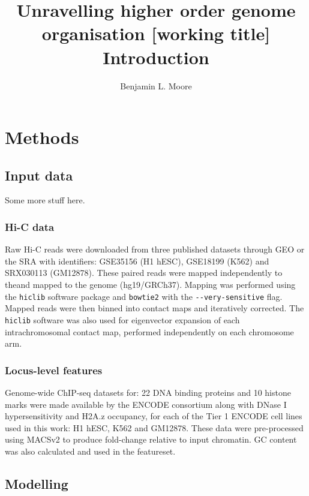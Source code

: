 \documentclass[a4paper,10pt,oneside]{book}
\title{ \vspace{3in} Unravelling higher order genome organisation {\small [working
    title]} \\ \vspace{2em} {\large {\bf Introduction}} }
\author{Benjamin L. Moore}
\begin{document}
\maketitle

\chapter{Methods}

\section{Input data}\label{input-data}

Some more stuff here.

\subsection{Hi-C data}\label{hi-c-data}

Raw Hi-C reads were downloaded from three published datasets through
GEO\citep{Barrett2013} or the SRA\citep{Leinonen2011a} with identifiers:
GSE35156 (H1 hESC), GSE18199 (K562) and SRX030113 (GM12878). These
paired reads were mapped independently to theand mapped to the genome
(hg19/GRCh37). Mapping was performed using the \texttt{hiclib} software
package\citep{Imakaev2012} and \texttt{bowtie2}\citep{Langmead2012} with
the \texttt{-{}-very-sensitive} flag. Mapped reads were then binned into
contact maps and iteratively corrected\citep{Imakaev2012}. The
\texttt{hiclib} software was also used for eigenvector expansion of each
intrachromosomal contact map, performed independently on each chromosome
arm.

\subsection{Locus-level features}\label{locus-level-features}

Genome-wide ChIP-seq datasets for: 22 DNA binding proteins and 10
histone marks were made available by the ENCODE
consortium\citep{Dunham2012, Boyle2014} along with DNase I
hypersensitivity and H2A.z occupancy, for each of the Tier 1 ENCODE cell
lines used in this work: H1 hESC, K562 and GM12878. These data were
pre-processed using MACSv2\citep{Zhang2008} to produce fold-change
relative to input chromatin. GC content was also calculated and used in
the featureset.

\section{Modelling}\label{modelling}
\end{document}
